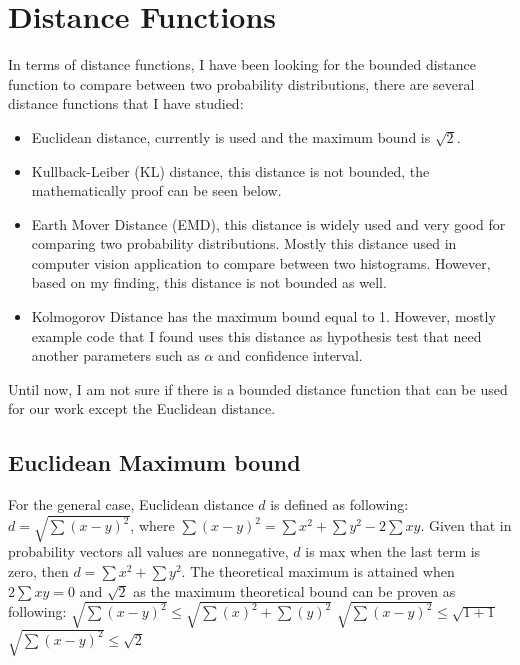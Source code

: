 \documentclass{article}
\begin{document}
\section{Distance Functions}


In terms of distance functions, I have been looking for the bounded distance function to compare between two probability distributions, there are several distance functions that I have studied: 

\begin{itemize}
	\item Euclidean distance, currently is used and the maximum bound is $ \sqrt{2} $.
	\item Kullback-Leiber (KL) distance, this distance is not bounded, the mathematically proof can be seen below.
	\item Earth Mover Distance (EMD), this distance is widely used and very good for comparing two probability distributions. Mostly this distance used in computer vision application to compare between two histograms. However, based on my finding, this distance is not bounded as well.
	\item Kolmogorov Distance has the maximum bound equal to 1. However, mostly example code that I found uses this distance as hypothesis test that need another parameters such as $\alpha$ and confidence interval. 
\end{itemize}
Until now, I am not sure if there is a bounded distance function that can be used for our work except the Euclidean distance. 

\subsection{Euclidean Maximum bound}
For the general case, Euclidean distance $d$ is defined as following: 
$d = \sqrt{\sum{(x-y)^2}}$, where $ \sum{(x-y)^2} = \sum x^2 + \sum y^2 - 2\sum xy$. Given that in probability vectors all values are nonnegative, $d$ is max when the last term is zero, then $d = \sum x^2 + \sum y^2$. The theoretical maximum is attained when $2\sum xy = 0$ and $\sqrt{2}$ as the maximum theoretical bound can be proven as following: 
\newline
$ \sqrt{\sum{(x-y)^2}} \leq \sqrt{\sum{(x)^2} + \sum{(y)^2}} $
\newline
$ \sqrt{\sum{(x-y)^2}} \leq \sqrt{1 + 1} $
\newline
$ \sqrt{\sum{(x-y)^2}} \leq \sqrt{2} $



\end{document}
